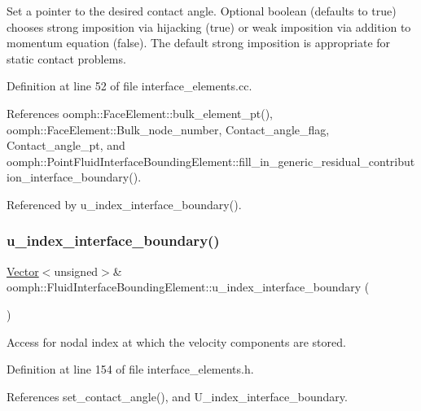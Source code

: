 Set a pointer to the desired contact angle. Optional boolean (defaults to true) chooses strong imposition via hijacking (true) or weak imposition via addition to momentum equation (false). The default strong imposition is appropriate for static contact problems. 

Definition at line 52 of file interface\+\_\+elements.\+cc.



References oomph\+::\+Face\+Element\+::bulk\+\_\+element\+\_\+pt(), oomph\+::\+Face\+Element\+::\+Bulk\+\_\+node\+\_\+number, Contact\+\_\+angle\+\_\+flag, Contact\+\_\+angle\+\_\+pt, and oomph\+::\+Point\+Fluid\+Interface\+Bounding\+Element\+::fill\+\_\+in\+\_\+generic\+\_\+residual\+\_\+contribution\+\_\+interface\+\_\+boundary().



Referenced by u\+\_\+index\+\_\+interface\+\_\+boundary().

\mbox{\label{classoomph_1_1FluidInterfaceBoundingElement_ad74aadb79a88536e188fbff44f35cc02}} 
\subsubsection{\texorpdfstring{u\+\_\+index\+\_\+interface\+\_\+boundary()}{u\_index\_interface\_boundary()}}
{\footnotesize\ttfamily \hyperlink{classoomph_1_1Vector}{Vector}$<$unsigned$>$\& oomph\+::\+Fluid\+Interface\+Bounding\+Element\+::u\+\_\+index\+\_\+interface\+\_\+boundary (\begin{DoxyParamCaption}{ }\end{DoxyParamCaption})\hspace{0.3cm}{\ttfamily [inline]}}



Access for nodal index at which the velocity components are stored. 



Definition at line 154 of file interface\+\_\+elements.\+h.



References set\+\_\+contact\+\_\+angle(), and U\+\_\+index\+\_\+interface\+\_\+boundary.

